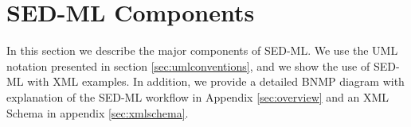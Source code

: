 
\section{SED-ML Components}
In this section we describe the major components of SED-ML. We use the UML notation presented in section \ref{sec:umlconventions}, and we show the use of SED-ML with XML examples. 
In addition, we provide a detailed BNMP diagram with explanation of the SED-ML workflow in Appendix \ref{sec:overview} and an XML Schema in appendix \ref{sec:xmlschema}. 

  

  



 

 

 


%

%

 

 








